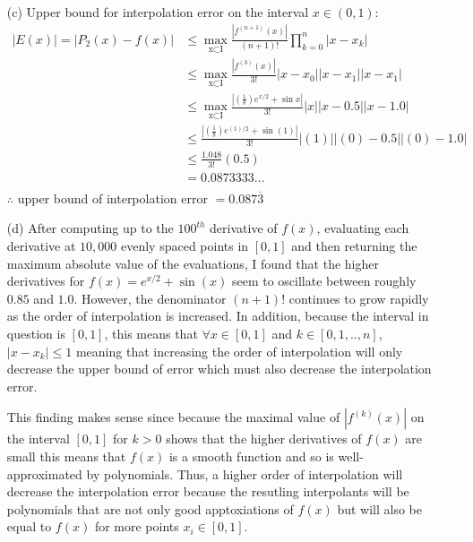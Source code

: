 \documentclass{article}
\begin{document}
\begin{enumerate}
    \item[(c)]  Upper bound for interpolation error on the interval $x\in(0,1)$:
                \begin{align*}
                    |E(x)| = |P_{2}(x)-f(x)| &\leq \underset{ \text{x} \subset \text{I}}{\max} \frac{|f^{(n+1)}(x)|}{(n+1)!}\prod_{k=0}^{n}|x-x_{k}|\\
                                             &\leq \underset{ \text{x} \subset \text{I}}{\max} \frac{|f^{(3)}(x)|}{3!}|x-x_{0}||x-x_{1}||x-x_{1}|\\
                                             &\leq \underset{ \text{x} \subset \text{I}}{\max} \frac{|(\frac{1}{8})e^{x/2}+\sin{x}|}{3!}|x||x-0.5||x-1.0|\\
                                             &\leq \frac{|(\frac{1}{8})e^{(1)/2}+\sin{(1)}|}{3!}|(1)||(0)-0.5||(0)-1.0|\\
                                             &\leq \frac{1.048}{3!}(0.5)\\
                                             &= 0.0873333... \\
                \end{align*}
                $\therefore$ upper bound of interpolation error $= 0.087\overline{3}$
                \vspace{10pt}
    
    \newpage

    \item[(d)]  After computing up to the $100^{th}$ derivative of $f(x)$, evaluating each derivative at $10,000$ evenly spaced
                points in $[0,1]$ and then returning the maximum absolute value of the evaluations, I found that the higher derivatives for
                $f(x)=e^{x/2}+\sin{(x)}$ seem to oscillate between roughly $0.85$ and $1.0$. However, the denominator $(n+1)!$ 
                continues to grow rapidly as the order of interpolation is increased. In addition, because the interval in question is $[0,1]$,
                this means that $\forall x \in [0,1]$ and $k \in [0,1,..,n]$, $|x-x_{k}|\leq 1$ meaning that increasing the order of
                interpolation will only decrease the upper bound of error which must also decrease the interpolation error.

                This finding makes sense since because the maximal value of $|f^{(k)}(x)|$ on the interval $[0,1]$ for $k>0$ shows that the
                higher derivatives of $f(x)$ are small this means that $f(x)$ is a smooth function and so is well-approximated by polynomials.
                Thus, a higher order of interpolation will decrease the interpolation error because the resutling interpolants will be
                polynomials that are not only good apptoxiations of $f(x)$ but will also be equal to $f(x)$ for more points $x_{i} \in [0,1]$. 
                

\end{enumerate}
\end{document}
